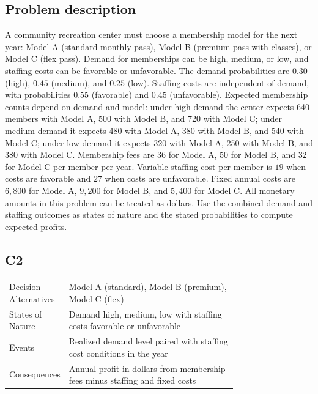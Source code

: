 

	
	\begin{ExamProblems}
		\item
		\subsection*{Problem description}
		A community recreation center must choose a membership model for the next year: Model A (standard monthly pass),
		Model B (premium pass with classes), or Model C (flex pass). Demand for memberships can be high, medium, or low, and staffing costs can be favorable or unfavorable. The demand probabilities are $0.30$ (high), $0.45$ (medium), and $0.25$ (low). Staffing costs are independent of demand, with probabilities $0.55$ (favorable) and $0.45$ (unfavorable). Expected membership counts depend on demand and model: under high demand the center expects 640 members with Model A, 500 with Model B, and 720 with Model C; under medium demand it expects 480 with Model A, 380 with Model B, and 540 with Model C; under low demand it expects 320 with Model A, 250 with Model B, and 380 with Model C. Membership fees are $36$ for Model A, $50$ for Model B, and $32$ for Model C per member per year. Variable staffing cost per member is $19$ when costs are favorable and $27$ when costs are unfavorable. Fixed annual costs are $6{,}800$ for Model A, $9{,}200$ for Model B, and $5{,}400$ for Model C. All monetary amounts in this problem can be treated as dollars. Use the combined demand and staffing outcomes as states of nature and the stated probabilities to compute expected profits.

		\subsection*{C2}
		\begin{center}
			\begin{tabular}{l p{0.74\linewidth}}
				\toprule
				Decision Alternatives & Model A (standard), Model B (premium), Model C (flex) \\
				States of Nature & Demand high, medium, low with staffing costs favorable or unfavorable \\
				Events & Realized demand level paired with staffing cost conditions in the year \\
				Consequences & Annual profit in dollars from membership fees minus staffing and fixed costs \\
				\bottomrule
			\end{tabular}
		\end{center}


\end{ExamProblems}
